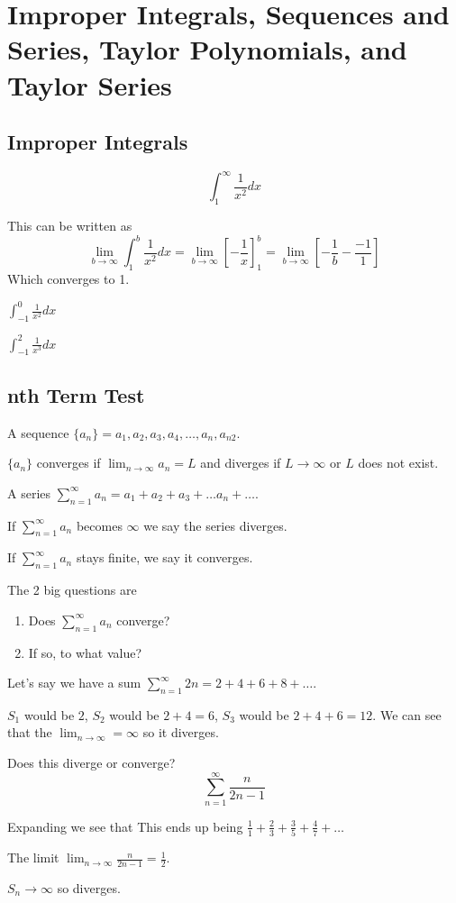 \documentclass[../bccalc.tex]{subfiles}
\begin{document}
\chapter{Improper Integrals, Sequences and Series, Taylor Polynomials, and Taylor Series}
\section{Improper Integrals}
\begin{example}
    \[ \int_1^{\infty} \frac{1}{x^2}dx \]

    This can be written as 
    \[ \lim_{b\to \infty}\int_1^b \frac{1}{x^2}dx=\lim_{b\to \infty}\left[-\frac{1}{x}\right]^b_1 = \lim_{b\to\infty}\left[-\frac{1}{b}-\frac{-1}{1}\right] \]
    Which converges to 1.
\end{example}

\ex $\int_{-1}^0 \frac{1}{x^2}dx$

\ex $\int_{-1}^2 \frac{1}{x^3}dx$
\section{nth Term Test}
A sequence $\{a_n\} = a_1, a_2, a_3, a_4,\dots, a_n,a_{n2}$.

$\{a_n\}$ converges if $\lim_{n\to \infty}a_n=L$ and diverges if $L\rightarrow \infty$ or $L$ does not exist.

A series $\sum_{n=1}^{\infty}a_n = a_1+a_2+a_3+\dots a_n+\dots$.

If $\sum_{n=1}^{\infty}a_n$ becomes $\infty$ we say the series diverges.

If $\sum_{n=1}^{\infty}a_n$ stays finite, we say it converges.

The 2 big questions are 
\begin{enumerate}
    \item Does $\sum_{n=1}^{\infty}a_n$ converge?
    \item If so, to what value?
\end{enumerate}

Let's say we have a sum $\sum_{n=1}^{\infty}2n = 2+4+6+8+\dots$.

$S_1$ would be $2$, $S_2$ would be $2+4=6$, $S_3$ would be $2+4+6=12$. We can see that the $\lim_{n\to\infty}=\infty$ so it diverges.
\pagebreak
\begin{example}
    Does this diverge or converge?
    \[ \sum_{n=1}^{\infty} \frac{n}{2n-1}\]

    Expanding we see that This ends up being $\frac{1}{1}+\frac{2}{3}+\frac{3}{5}+\frac{4}{7}+\dots$

    The limit $\lim_{n\to\infty}\frac{n}{2n-1}=\frac{1}{2}$.

    $S_n\rightarrow \infty$ so diverges.
\end{example}
\end{document}
